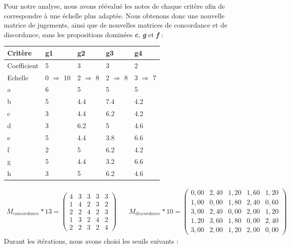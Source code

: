 \documentclass[12pt]{article}
\begin{document}
Pour notre analyse, nous avons réévalué les notes de chaque critère afin de correspondre à une échelle plus adaptée. Nous obtenons donc une nouvelle matrice de jugements, ainsi que de nouvelles matrices de concordance et de discordance, sans les propositions dominées \textbf{\emph{c}}, \textbf{\emph{g}} et \textbf{\emph{f}} :
\begin{center}
\renewcommand{\arraystretch}{1.2}
\begin{tabular}{|L|M|M|M|M|}
\hline 
Critère & g1 & g2 & g3 & g4 \\\hline  
Coefficient & 5 & 3 & 3 & 2 \\ \hline 
Echelle & 0 $ \Rightarrow $ 10 & 2 $ \Rightarrow $ 8 & 2 $ \Rightarrow $ 8 & 3 $ \Rightarrow $ 7 \\ \hline 
a & 6 & 5 & 5 & 5 \\ \hline 
b & 5 & 4.4 & 7.4 & 4.2 \\ \hline 
c & 3 & 4.4 & 6.2 & 4.2 \\ \hline 
d & 3 & 6.2 & 5 & 4.6 \\ \hline 
e & 5 & 4.4 & 3.8 & 6.6 \\ \hline 
f & 2 & 5 & 6.2 & 4.2 \\ \hline 
g & 5 & 4.4 & 3.2 & 6.6 \\ \hline 
h & 3 & 5 & 6.2 & 4.6 \\ 
\hline 
\end{tabular} 
\end{center}
\begin{align*}
M_{concordance}*13 =
 \begin{pmatrix}
  4	&3	&3	&3	&3\\
1	&4	&2	&3	&2\\
2	&2	&4	&2	&3\\
1	&3	&2	&4	&2\\
2	&2	&3	&2	&4
 \end{pmatrix}& \quad
 M_{discordance}*10 =
 \begin{pmatrix}
 0,00	&2,40 &1,20 &1,60 &1,20\\
 1,00   &0,00 &1,80	&2,40 &0,60\\
 3,00	&2,40 &0,00 &2,00 &1,20\\
 1,20	&3,60	&1,80 &0,00	&2,40\\
 3,00	&2,00	&1,20  &2,00  &0,00
 \end{pmatrix}
\end{align*}
Durant les itérations, nous avons choisi les seuils suivants :
\end{document}
